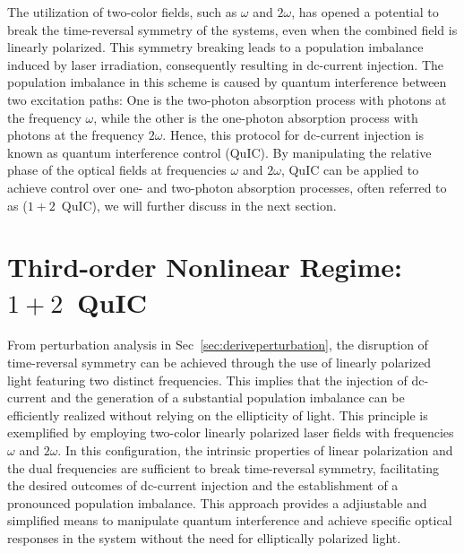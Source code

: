 The utilization of two-color fields, such as  $\omega$ and  $2\omega$, has opened a potential to
break the time-reversal symmetry of the systems, even when the combined field is linearly
polarized. This symmetry breaking leads to a population imbalance induced by laser irradiation,
consequently resulting in dc-current injection. The population imbalance in this scheme is caused
by quantum interference between two excitation paths: One is the two-photon absorption process with
photons at the frequency  $\omega$, while the other is the one-photon absorption process with
photons at the frequency  $2\omega$. Hence, this protocol for dc-current injection is known as
quantum interference control (\gls{QuIC}). By manipulating the relative phase of the optical fields
at frequencies  $\omega$ and $2\omega$, \gls{QuIC} can be applied to achieve control over one- and
two-photon absorption processes, often referred to as ($1+2$~QuIC), we will further discuss in the
next section.
\section{Third-order Nonlinear Regime: $1+2$~QuIC \label{sec:perturbative}}

From perturbation analysis in Sec~\ref{sec:deriveperturbation}, the disruption of time-reversal symmetry can be achieved through the use of linearly polarized light featuring two distinct frequencies. This implies that the injection of dc-current and the generation of a substantial population imbalance can be efficiently realized without relying on the ellipticity of light. This principle is exemplified by employing two-color linearly polarized laser fields with frequencies $\omega$ and $2\omega$. In this configuration, the intrinsic properties of linear polarization and the dual frequencies are sufficient to break time-reversal symmetry, facilitating the desired outcomes of dc-current injection and the establishment of a pronounced population imbalance. This approach provides a adjiustable and simplified means to manipulate quantum interference and achieve specific optical responses in the system without the need for elliptically polarized light.\\

